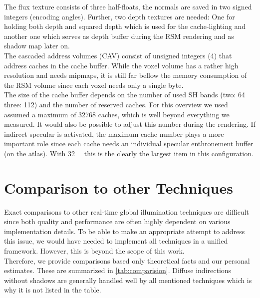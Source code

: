 \documentclass[thesis.tex]{subfiles}
\begin{document}
The flux texture consists of three half-floats, the normals are saved in two signed integers (encoding angles).
Further, two depth textures are needed:
One for holding both depth and squared depth which is used for the cache-lighting and another one which serves as depth buffer during the RSM rendering and as shadow map later on.
\\
The cascaded address volumes (CAV) consist of unsigned integers (\SI{4}{\byte}) that address caches in the cache buffer.
While the voxel volume has a rather high resolution and needs mipmaps, it is still far bellow the memory consumption of the RSM volume since each voxel needs only a single byte.
\\
The size of the cache buffer depends on the number of used SH bands (two: \SI{64}{\byte} three: \SI{112}{\byte}) and the number of reserved caches.
For this overview we used assumed a maximum of 32768 caches, which is well beyond everything we measured.
It would also be possible to adjust this number during the rendering.
If indirect specular is activated, the maximum cache number plays a more important role since each cache needs an individual specular enthronement buffer (on the atlas).
With \SI{32}{\mebi\byte} this is the clearly the largest item in this configuration.

\section{Comparison to other Techniques} \label{sec:eva:comparisiontoother}
Exact comparisons to other real-time global illumination techniques are difficult since both quality and performance are often highly dependent on various implementation details.
To be able to make an appropriate attempt to address this issue, we would have needed to implement all techniques in a unified framework.
However, this is beyond the scope of this work.
\\
Therefore, we provide comparisons based only theoretical facts and our personal estimates.
These are summarized in \autoref{tab:comparision}.
Diffuse indirections without shadows are generally handled well by all mentioned techniques which is why it is not listed in the table.
\end{document}
